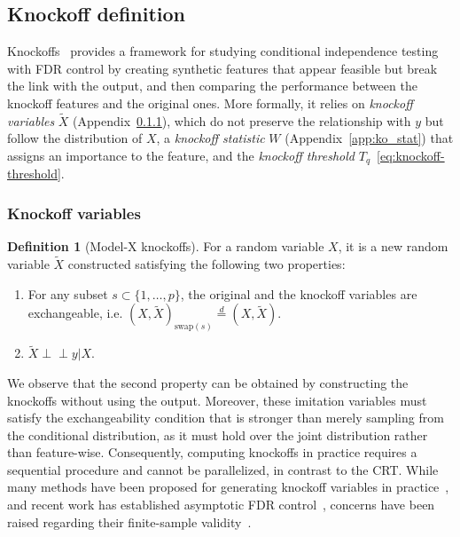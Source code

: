 \documentclass{article}
\theoremstyle{plain}
\theoremstyle{definition}
\newtheorem{definition}[theorem]{Definition}
\theoremstyle{remark}
\newcommand{\indep}{\perp\!\!\!\perp}
\begin{document}
\subsection{Knockoff definition}\label{append:Knockoff_def}

Knockoffs~\cite{candes2018panning} provides a framework for studying conditional independence testing with FDR control by creating synthetic features that appear feasible but break the link with the output, and then comparing the performance between the knockoff features and the original ones. More formally, it relies on \textit{knockoff variables} $\widetilde{X}$ (Appendix~\ref{app:ko_variables}), which do not preserve the relationship with $y$ but follow the distribution of $X$, a \textit{knockoff statistic} $W$ (Appendix~\ref{app:ko_stat}) that assigns an importance to the feature, and the \textit{knockoff threshold} $T_q$~\eqref{eq:knockoff-threshold}.


\subsubsection{Knockoff variables}\label{app:ko_variables}



\begin{definition}[Model-X knockoffs] For a random variable $X$, it is a new random variable $\widetilde{X}$ constructed satisfying the following two properties:
\begin{enumerate}
    \item For any subset $s\subset \{1,\ldots,p\}$, the original and the knockoff variables are exchangeable, i.e. $(X, \widetilde{X})_{\mathrm{swap}(s)}\overset{d}{=}(X, \widetilde{X})$.
    \item $\widetilde{X}\indep y|X$.
\end{enumerate}\label{def:Model-X_knockoffs}
\end{definition}

We observe that the second property can be obtained by constructing the knockoffs without using the output. Moreover, these imitation variables must satisfy the exchangeability condition that is stronger than merely sampling from the conditional distribution, as it must hold over the joint distribution rather than feature-wise. Consequently, computing knockoffs in practice requires a sequential procedure and cannot be parallelized, in contrast to the CRT. While many methods have been proposed for generating knockoff variables in practice~\cite{sesia2019gene, romano2020deep, bates2021metropolized}, and recent work has established asymptotic FDR control~\cite{fan2025asymptoticfdrcontrolmodelx}, concerns have been raised regarding their finite-sample validity~\cite{blain2025knockoffsfaildiagnosingfixing}.
\end{document}
